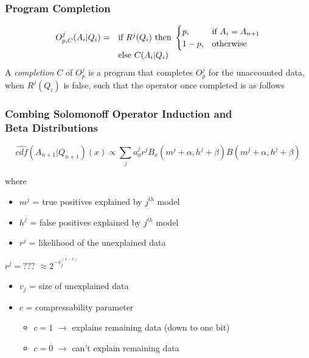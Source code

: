 \documentclass{beamer}
\begin{document}
\begin{frame}
  \frametitle{Program Completion}
  $$
  \begin{array}{@{}ll@{}}
    O^j_{p, C}(A_i|Q_i) = &
                            \text{if}\ R^j(Q_i)\ \text{then}\
                            \begin{cases}
                              p, & \text{if}\ A_i = A_{n+1} \\
                              1-p, & \text{otherwise}
                            \end{cases}\\
                          & \text{else}\ C(A_i|Q_i)
  \end{array}
  $$
  A \emph{completion} $C$ of $O^j_p$ is a program that completes
  $O^j_p$ for the unaccounted data, when $R^j(Q_i)$ is false, such
  that the operator once completed is as follows
\end{frame}

\begin{frame}
  \frametitle{Combing Solomonoff Operator Induction and\\
    Beta Distributions}

  $$
    \hat{cdf}(A_{n+1}|Q_{n+1})(x) \propto \sum_j a_0^j r^j
    B_x(m^j+\alpha, h^j+\beta)
    B(m^j+\alpha, h^j+\beta)
  $$

  where
  \begin{itemize}
  \item $m^j$ = true positives explained by $j^{th}$ model
  \item $h^j$ = false positives explained by $j^{th}$ model
  \item $r^j$ = likelihood of the unexplained data
  \end{itemize}

  \pause

  $r^j = ???$ \pause $\approx 2^{-v_j^{(1-c)}}$
  \begin{itemize}
  \item $v_j$ = size of unexplained data
  \item $c$ = compressability parameter
    \begin{itemize}
    \item $c=1$ $\rightarrow$ explains remaining data (down to one
      bit)
    \item $c=0$ $\rightarrow$ can't explain remaining data
    \end{itemize}
  \end{itemize}
\end{frame}
\end{document}
